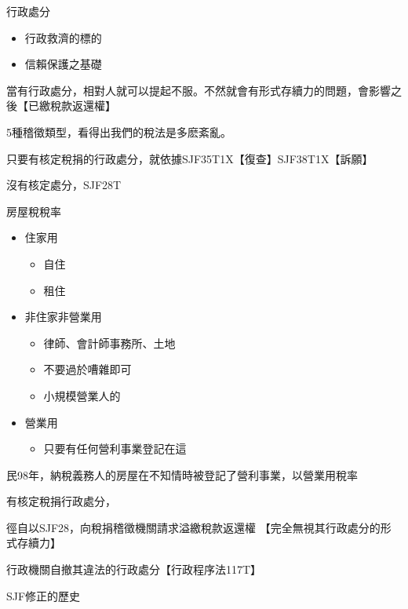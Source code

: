 \documentclass[]{ctexbook}
\providecommand{\tightlist}{%
  \setlength{\itemsep}{0pt}\setlength{\parskip}{0pt}}
\begin{document}
行政處分

\begin{itemize}
\tightlist
\item
  行政救濟的標的
\item
  信賴保護之基礎
\end{itemize}

當有行政處分，相對人就可以提起不服。不然就會有形式存續力的問題，會影響之後【已繳稅款返還權】

5種稽徵類型，看得出我們的稅法是多麽紊亂。

只要有核定稅捐的行政處分，就依據SJF35T1X【復查】SJF38T1X【訴願】

沒有核定處分，SJF28T

房屋稅稅率

\begin{itemize}
\tightlist
\item
  住家用

  \begin{itemize}
  \tightlist
  \item
    自住
  \item
    租住
  \end{itemize}
\item
  非住家非營業用

  \begin{itemize}
  \tightlist
  \item
    律師、會計師事務所、土地
  \item
    不要過於嘈雜即可
  \item
    小規模營業人的
  \end{itemize}
\item
  營業用

  \begin{itemize}
  \tightlist
  \item
    只要有任何營利事業登記在這
  \end{itemize}
\end{itemize}

民98年，納稅義務人的房屋在不知情時被登記了營利事業，以營業用稅率

有核定稅捐行政處分，

徑自以SJF28，向稅捐稽徵機關請求溢繳稅款返還權
【完全無視其行政處分的形式存續力】

行政機關自撤其違法的行政處分【行政程序法117T】

SJF修正的歷史
\end{document}
